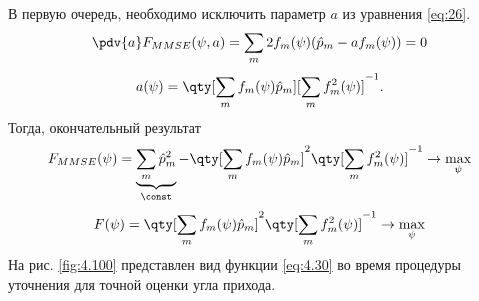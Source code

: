 В первую очередь, необходимо исключить параметр $a$ из уравнения \eqref{eq:26}.
\begin{equation}
    \pdv{a} F_{MMSE}(\psi, a) = \sum\limits_m 2f_m(\psi) (\hat p_m - a f_m(\psi)) = 0
\end{equation}
\begin{equation}
    a(\psi) = \qty[\sum\limits_m f_m(\psi) \hat p_m][\sum\limits_m f_m^2(\psi)]^{-1}.
\end{equation}
Тогда, окончательный результат
\begin{equation}
    F_{MMSE}(\psi)=\underbrace{\sum\limits_m \hat p_m^2}_{\const} - \qty[\sum\limits_m f_m(\psi) \hat p_m]^2 \qty[\sum \limits_m f_m^2 (\psi)]^{-1} \to \max_{\psi}
\end{equation}
\begin{equation}
    \label{eq:4.30}
    F(\psi)=\qty[\sum\limits_m f_m(\psi) \hat p_m]^2 \qty[\sum \limits_m f_m^2 (\psi)]^{-1} \to \max_{\psi}
\end{equation}
На рис. \ref{fig:4.100} представлен вид функции \eqref{eq:4.30} во время процедуры уточнения для точной оценки угла прихода.

